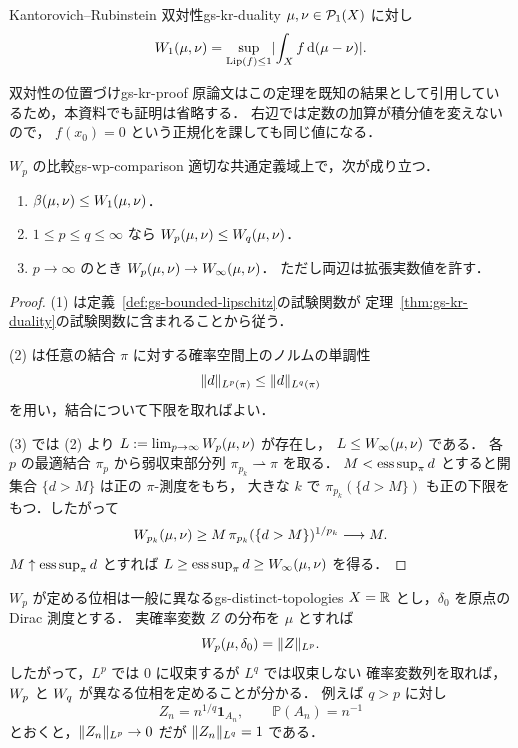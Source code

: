 \begin{theorem}{Kantorovich–Rubinstein 双対性}{gs-kr-duality}
  $\mu,\nu\in\mathcal{P}_{1}(X)$ に対し
  \[
    W_1(\mu,\nu)
    =
    \sup_{\operatorname{Lip}(f)\leq1}
    \lvert \int_X f\,\mathrm{d}(\mu-\nu) \rvert.
  \]
\end{theorem}

\begin{remark}{双対性の位置づけ}{gs-kr-proof}
  原論文はこの定理を既知の結果として引用しているため，本資料でも証明は省略する．
  右辺では定数の加算が積分値を変えないので，
  $f(x_0)=0$ という正規化を課しても同じ値になる．
\end{remark}

\begin{proposition}{$W_p$ の比較}{gs-wp-comparison}
  適切な共通定義域上で，次が成り立つ．
  \begin{enumerate}
    \item $\beta(\mu,\nu)\leq W_1(\mu,\nu)$．
    \item $1\leq p\leq q\leq\infty$ なら
      $W_p(\mu,\nu)\leq W_q(\mu,\nu)$．
    \item $p\to\infty$ のとき
      $W_p(\mu,\nu)\to W_\infty(\mu,\nu)$．
      ただし両辺は拡張実数値を許す．
  \end{enumerate}
\end{proposition}

\begin{proof}
  (1) は定義~\ref{def:gs-bounded-lipschitz}の試験関数が
  定理~\ref{thm:gs-kr-duality}の試験関数に含まれることから従う．

  (2) は任意の結合 $\pi$ に対する確率空間上のノルムの単調性
  \[
    \lVert d \rVert_{L^p(\pi)}\leq\lVert d \rVert_{L^q(\pi)}
  \]
  を用い，結合について下限を取ればよい．

  (3) では (2) より $L:=\lim_{p\to\infty}W_p(\mu,\nu)$ が存在し，
  $L\leq W_\infty(\mu,\nu)$ である．
  各 $p$ の最適結合 $\pi_p$ から弱収束部分列
  $\pi_{p_k}\rightharpoonup\pi$ を取る．
  $M<\operatorname{ess\,sup}_\pi d$ とすると開集合 $\{d>M\}$ は正の $\pi$-測度をもち，
  大きな $k$ で $\pi_{p_k}(\{d>M\})$ も正の下限をもつ．したがって
  \[
    W_{p_k}(\mu,\nu)
    \geq
    M\,\pi_{p_k}(\{d>M\})^{1/p_k}
    \longrightarrow M.
  \]
  $M\uparrow\operatorname{ess\,sup}_\pi d$ とすれば
  $L\geq\operatorname{ess\,sup}_\pi d\geq W_\infty(\mu,\nu)$ を得る．
\end{proof}

\begin{example}{$W_p$ が定める位相は一般に異なる}{gs-distinct-topologies}
  $X=\mathbb{R}$ とし，$\delta_0$ を原点の Dirac 測度とする．
  実確率変数 $Z$ の分布を $\mu$ とすれば
  \[
    W_p(\mu,\delta_0)=\lVert Z \rVert_{L^p}.
  \]
  したがって，$L^p$ では $0$ に収束するが $L^q$ では収束しない
  確率変数列を取れば，$W_p$ と $W_q$ が異なる位相を定めることが分かる．
  例えば $q>p$ に対し
  \[
    Z_n=n^{1/q}\mathbf{1}_{A_n},
    \qquad
    \mathbb{P}(A_n)=n^{-1}
  \]
  とおくと，$\lVert Z_n \rVert_{L^p}\to0$ だが
  $\lVert Z_n \rVert_{L^q}=1$ である．
\end{example}

